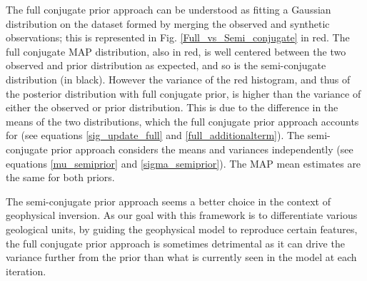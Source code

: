 \documentclass[extra]{gji} %
\begin{document}
The full conjugate prior approach can be understood as fitting a Gaussian distribution on the dataset formed by merging the observed and synthetic observations; this is represented in Fig. \ref{Full_vs_Semi_conjugate} in red. The full conjugate MAP distribution, also in red, is well centered between the two observed and prior distribution as expected, and so is the semi-conjugate distribution (in black). However the variance of the red histogram, and thus of the posterior distribution with full conjugate prior, is higher than the variance of either the observed or prior distribution. This is due to the difference in the means of the two distributions, which the full conjugate prior approach accounts for (see equations \ref{sig_update_full} and \ref{full_additionalterm}). The semi-conjugate prior approach considers the means and variances independently (see equations \ref{mu_semiprior} and \ref{sigma_semiprior}). The MAP mean estimates are the same for both priors.

The semi-conjugate prior approach seems a better choice in the context of geophysical inversion. As our goal with this framework is to differentiate various geological units, by guiding the geophysical model to reproduce certain features, the full conjugate prior approach is sometimes detrimental as it can drive the variance further from the prior than what is currently seen in the model at each iteration.


 \label{section:pseudocode}
\end{document}
